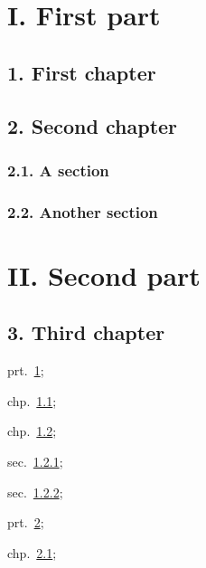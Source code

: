 \hypertarget{prt:prt1}{%
\section{I. First part}\label{prt:prt1}}

\hypertarget{sec:cha1}{%
\subsection{1. First chapter}\label{sec:cha1}}

\hypertarget{sec:cha2}{%
\subsection{2. Second chapter}\label{sec:cha2}}

\hypertarget{sec:sec21}{%
\subsubsection{2.1. A section}\label{sec:sec21}}

\hypertarget{sec:sec22}{%
\subsubsection{2.2. Another section}\label{sec:sec22}}

\hypertarget{prt:prt2}{%
\section{II. Second part}\label{prt:prt2}}

\hypertarget{sec:cha3}{%
\subsection{3. Third chapter}\label{sec:cha3}}

prt.~\ref{prt:prt1};

chp.~\ref{sec:cha1};

chp.~\ref{sec:cha2};

sec.~\ref{sec:sec21};

sec.~\ref{sec:sec22};

prt.~\ref{prt:prt2};

chp.~\ref{sec:cha3};
